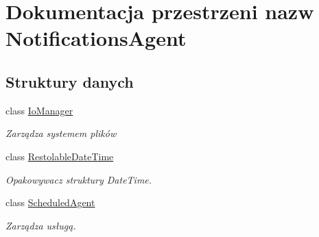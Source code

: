 \hypertarget{a00295}{}\section{Dokumentacja przestrzeni nazw Notifications\+Agent}
\label{a00295}
\subsection*{Struktury danych}
\begin{DoxyCompactItemize}
\item 
class \hyperlink{a00028}{Io\+Manager}
\begin{DoxyCompactList}\small\item\em Zarządza systemem plików \end{DoxyCompactList}\item 
class \hyperlink{a00048}{Restolable\+Date\+Time}
\begin{DoxyCompactList}\small\item\em Opakowywacz struktury Date\+Time. \end{DoxyCompactList}\item 
class \hyperlink{a00052}{Scheduled\+Agent}
\begin{DoxyCompactList}\small\item\em Zarządza usługą. \end{DoxyCompactList}\end{DoxyCompactItemize}
